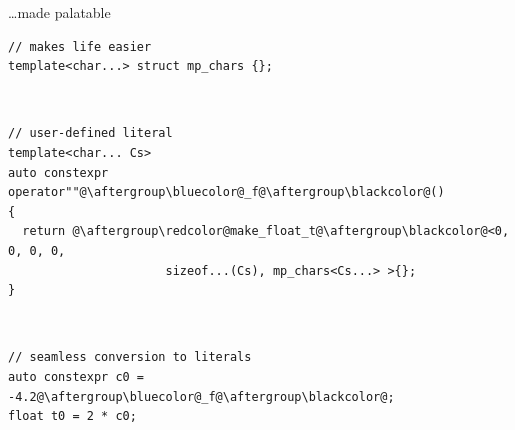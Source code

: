 \documentclass[xcolor=dvipsnames]{beamer}
\begin{document}
\begin{frame}[fragile]{\ldots made palatable}
\begin{lstlisting}
// makes life easier
template<char...> struct mp_chars {};
\end{lstlisting}

~

\begin{lstlisting}
// user-defined literal
template<char... Cs>
auto constexpr operator""@\aftergroup\bluecolor@_f@\aftergroup\blackcolor@()
{
  return @\aftergroup\redcolor@make_float_t@\aftergroup\blackcolor@<0, 0, 0, 0,
                      sizeof...(Cs), mp_chars<Cs...> >{};
}
\end{lstlisting}

~

\begin{lstlisting}
// seamless conversion to literals
auto constexpr c0 = -4.2@\aftergroup\bluecolor@_f@\aftergroup\blackcolor@;
float t0 = 2 * c0;
\end{lstlisting}
\end{frame}








\end{document}
